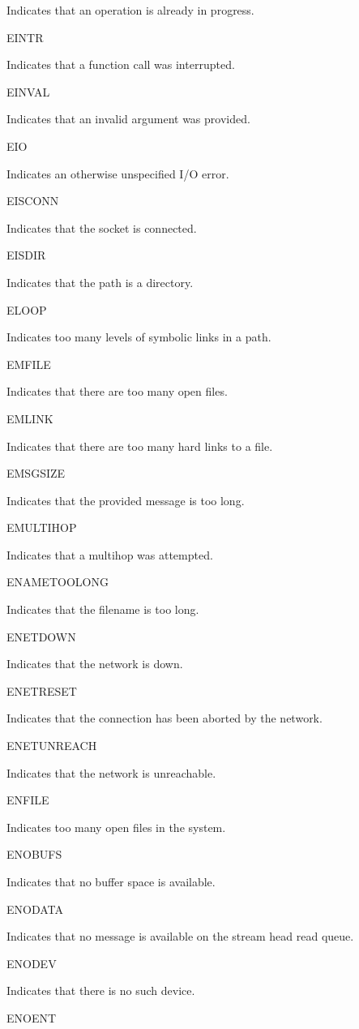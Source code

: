 Indicates that an operation is already in progress.

EINTR

Indicates that a function call was interrupted.

EINVAL

Indicates that an invalid argument was provided.

EIO

Indicates an otherwise unspecified I/O error.

EISCONN

Indicates that the socket is connected.

EISDIR

Indicates that the path is a directory.

ELOOP

Indicates too many levels of symbolic links in a path.

EMFILE

Indicates that there are too many open files.

EMLINK

Indicates that there are too many hard links to a file.

EMSGSIZE

Indicates that the provided message is too long.

EMULTIHOP

Indicates that a multihop was attempted.

ENAMETOOLONG

Indicates that the filename is too long.

ENETDOWN

Indicates that the network is down.

ENETRESET

Indicates that the connection has been aborted by the network.

ENETUNREACH

Indicates that the network is unreachable.

ENFILE

Indicates too many open files in the system.

ENOBUFS

Indicates that no buffer space is available.

ENODATA

Indicates that no message is available on the stream head read queue.

ENODEV

Indicates that there is no such device.

ENOENT


